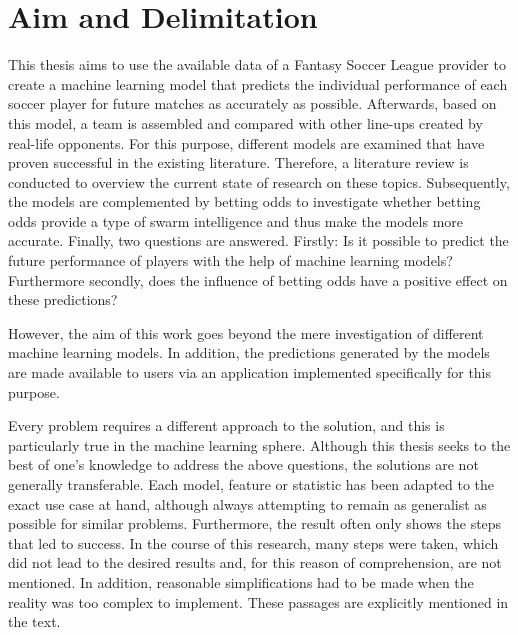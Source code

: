 \clearpage \section{Aim and Delimitation}

This thesis aims to use the available data of a Fantasy Soccer League provider to create a machine learning model that predicts the individual performance of each soccer player for future matches as accurately as possible. Afterwards, based on this model, a team is assembled and compared with other line-ups created by real-life opponents. For this purpose, different models are examined that have proven successful in the existing literature. Therefore, a literature review is conducted to overview the current state of research on these topics. Subsequently, the models are complemented by betting odds to investigate whether betting odds provide a type of swarm intelligence and thus make the models more accurate. Finally, two questions are answered. Firstly: Is it possible to predict the future performance of players with the help of machine learning models? Furthermore secondly, does the influence of betting odds have a positive effect on these predictions?

However, the aim of this work goes beyond the mere investigation of different machine learning models. In addition, the predictions generated by the models are made available to users via an application implemented specifically for this purpose.  

Every problem requires a different approach to the solution, and this is particularly true in the machine learning sphere. Although this thesis seeks to the best of one's knowledge to address the above questions, the solutions are not generally transferable. Each model, feature or statistic has been adapted to the exact use case at hand, although always attempting to remain as generalist as possible for similar problems. Furthermore, the result often only shows the steps that led to success. In the course of this research, many steps were taken, which did not lead to the desired results and, for this reason of comprehension, are not mentioned. In addition, reasonable simplifications had to be made when the reality was too complex to implement. These passages are explicitly mentioned in the text.  


